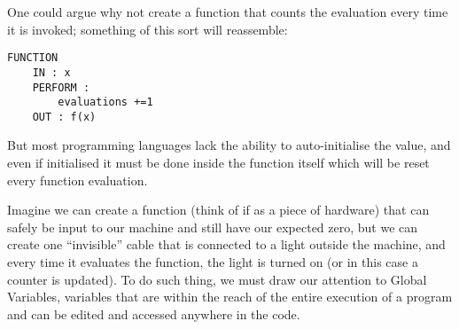 



One could argue why not create a function that counts the evaluation every time it is invoked; something of this sort will reassemble: 
\begin{lstlisting}
FUNCTION 
    IN : x
    PERFORM : 
        evaluations +=1
    OUT : f(x)
\end{lstlisting}

But most programming languages lack the ability to auto-initialise the value, and even if initialised it must be done inside the function itself which will be reset every function evaluation.

Imagine we can create a function (think of if as a piece of hardware) that can safely be input to our machine and still have our expected zero, but we  can create one ``invisible'' cable that is connected to a light outside the machine, and every time it evaluates the function, the light is turned on (or in this case a counter is updated). To do such thing, we must draw our attention to Global Variables, variables that are within the reach of the entire execution of a program and can be edited and accessed anywhere in the code. 

